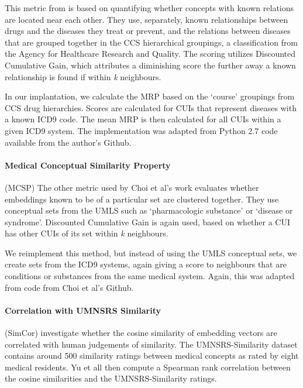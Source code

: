 \documentclass[10pt]{article}
\begin{document}
This metric from \cite{choiLearningLowDimensionalRepresentations2016} is based on quantifying whether concepts with known relations are located near each other. They use, separately, known relationships between drugs and the diseases they treat or prevent, and the relations between diseases that are grouped together in the CCS hierarchical groupings, a classification from the Agency for Healthcare Research and Quality. The scoring utilizes Discounted Cumulative Gain, which attributes a diminishing score the further away a known relationship is found if within \emph{k} neighbours. 

In our implantation, we calculate the MRP based on the `course' groupings from CCS drug hierarchies. Scores are calculated for CUIs that represent diseases with a known ICD9 code. The mean MRP is then calculated for all CUIs within a given ICD9 system. The implementation was adapted from Python 2.7 code available from the author's Github.


\paragraph{Medical Conceptual Similarity Property}(MCSP) The other metric used by Choi et al's work evaluates whether embeddings known to be of a particular set are clustered together. They use conceptual sets from the UMLS such as `pharmacologic substance' or `disease or syndrome'.  Discounted Cumulative Gain is again used, based on whether a CUI has other CUIs of its set within \emph{k} neighbours. 

We reimplement this method, but instead of using the UMLS conceptual sets, we create sets from the ICD9 systems, again giving a score to neighbours that are conditions or substances from the same medical system. Again, this was adapted from code from Choi et al's Github.  

\paragraph{Correlation with UMNSRS Similarity}(SimCor)
\cite{yuRetrofittingConceptVector2017} investigate whether the cosine similarity of embedding vectors are correlated with human judgements of similarity. The UMNSRS-Similarity dataset \cite{pakhomovSemanticRelatednessSimilarity2018} contains around 500 similarity ratings between medical concepts as rated by eight medical residents. Yu et all then compute a Spearman rank correlation between the cosine similarities and the UMNSRS-Similarity ratings.
\end{document}
